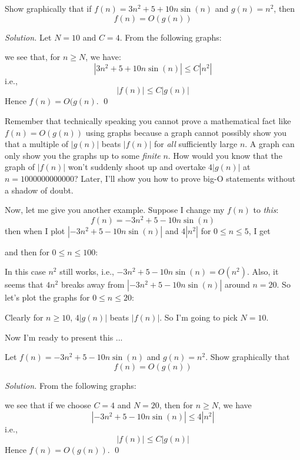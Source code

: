 \newpage
\begin{eg}
Show graphically that if 
$f(n) = 3n^2 + 5 + 10 n \sin (n)$
and $g(n) = n^2$, then
\[
f(n) = O(g(n))
\]
\end{eg}

\textit{Solution.}
Let $N = 10$ and $C = 4$.
From the following graphs:


we see that, for $n \geq N$, we have:
\[
|3n^2 + 5 + 10n \sin(n)| \leq C |n^2|
\]
i.e.,
\[
|f(n)| \leq C|g(n)|
\]
Hence $f(n) = O(g(n)$.
\qed

Remember that technically speaking you cannot prove a mathematical
fact like $f(n) = O(g(n))$ using graphs
because a graph cannot possibly show you that a multiple of $|g(n)|$
beats $|f(n)|$ for \textit{all} sufficiently large $n$.
A graph can only show you the graphs up to some \textit{finite} $n$.
How would you know that the graph 
of $|f(n)|$ won't suddenly shoot up and overtake $4|g(n)|$ at 
$n = 1000000000000$?
Later, I'll show you how to prove big-O statements without a shadow of doubt.

Now, let me give you another example.
Suppose I change my $f(n)$ to \textit{this}:
\[
f(n) = -3n^2 + 5 - 10 n \sin (n)
\]
then when I plot
$|-3n^2 + 5 - 10 n \sin (n)|$ 
and $4|n^2|$ for $0 \leq n \leq 5$,
I get

and then for $0 \leq n \leq 100$:

In this case $n^2$ still works, i.e., 
$-3n^2 + 5 - 10 n \sin (n) = O(n^2)$.
Also, it seems that $4n^2$ breaks away from 
$|-3n^2+5-10n \sin(n)|$ around $n = 20$.
So let's plot the graphs for $0 \leq n \leq 20$:

Clearly for $n \geq 10$, $4|g(n)|$ beats $|f(n)|$.
So I'm going to pick $N = 10$.

Now I'm ready to present this ...

\newpage

\begin{eg}
Let $f(n) = -3n^2+5-10n \sin(n)$ and $g(n) = n^2$.
Show graphically that 
\[
f(n) = O(g(n))
\]
\end{eg}

\textit{Solution.}
From the following graphs:


we see that if we choose $C = 4$ and $N  = 20$, then for $n \geq N$,
we have
\[
|-3n^2+5-10n \sin(n)| \leq 4|n^2|
\]
i.e.,
\[
|f(n)| \leq C|g(n)|
\]
Hence $f(n) = O(g(n))$.
\qed

\newpage

